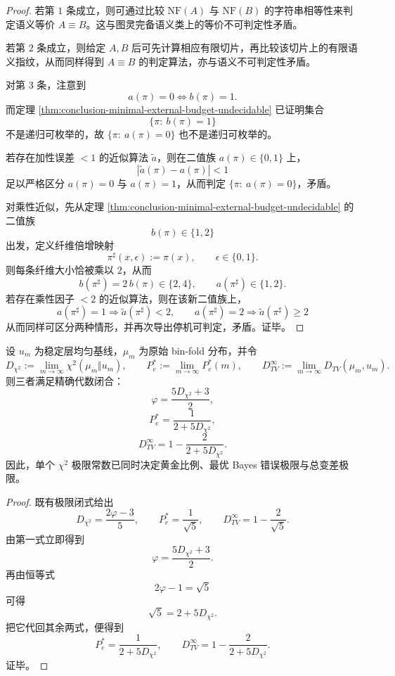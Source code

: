 \begin{proof}
若第 \(1\) 条成立，则可通过比较 \(\mathrm{NF}(A)\) 与 \(\mathrm{NF}(B)\) 的字符串相等性来判定语义等价 \(A\equiv B\)。这与图灵完备语义类上的等价不可判定性矛盾。

若第 \(2\) 条成立，则给定 \(A,B\) 后可先计算相应有限切片，再比较该切片上的有限语义指纹，从而同样得到 \(A\equiv B\) 的判定算法，亦与语义不可判定性矛盾。

对第 \(3\) 条，注意到
\[
a(\pi)=0 \iff b(\pi)=1.
\]
而定理 \ref{thm:conclusion-minimal-external-budget-undecidable} 已证明集合
\[
\{\pi:\ b(\pi)=1\}
\]
不是递归可枚举的，故 \(\{\pi:\ a(\pi)=0\}\) 也不是递归可枚举的。

若存在加性误差 \(<1\) 的近似算法 \(\widetilde a\)，则在二值族 \(a(\pi)\in\{0,1\}\) 上，
\[
|\widetilde a(\pi)-a(\pi)|<1
\]
足以严格区分 \(a(\pi)=0\) 与 \(a(\pi)=1\)，从而判定 \(\{\pi:\ a(\pi)=0\}\)，矛盾。

对乘性近似，先从定理 \ref{thm:conclusion-minimal-external-budget-undecidable} 的二值族
\[
b(\pi)\in\{1,2\}
\]
出发，定义纤维倍增映射
\[
\pi^\sharp(x,\epsilon):=\pi(x),
\qquad
\epsilon\in\{0,1\}.
\]
则每条纤维大小恰被乘以 \(2\)，从而
\[
b(\pi^\sharp)=2\,b(\pi)\in\{2,4\},
\qquad
a(\pi^\sharp)\in\{1,2\}.
\]
若存在乘性因子 \(<2\) 的近似算法，则在该新二值族上，
\[
a(\pi^\sharp)=1\Rightarrow \widetilde a(\pi^\sharp)<2,
\qquad
a(\pi^\sharp)=2\Rightarrow \widetilde a(\pi^\sharp)\ge 2
\]
从而同样可区分两种情形，并再次导出停机可判定，矛盾。证毕。
\end{proof}

\begin{theorem}\label{thm:conclusion-binfold-single-constant-holography}
设 \(u_m\) 为稳定层均匀基线，\(\mu_m\) 为原始 bin-fold 分布，并令
\[
D_{\chi^2}:=\lim_{m\to\infty}\chi^2(\mu_m\Vert u_m),
\qquad
P_e^\ast:=\lim_{m\to\infty}P_e^\ast(m),
\qquad
D_{TV}^\infty:=\lim_{m\to\infty}D_{TV}(\mu_m,u_m).
\]
则三者满足精确代数闭合：
\[
\varphi=\frac{5D_{\chi^2}+3}{2},
\]
\[
P_e^\ast=\frac{1}{2+5D_{\chi^2}},
\]
\[
D_{TV}^\infty=1-\frac{2}{2+5D_{\chi^2}}.
\]
因此，单个 \(\chi^2\) 极限常数已同时决定黄金比例、最优 Bayes 错误极限与总变差极限。
\end{theorem}

\begin{proof}
既有极限闭式给出
\[
D_{\chi^2}=\frac{2\varphi-3}{5},
\qquad
P_e^\ast=\frac1{\sqrt5},
\qquad
D_{TV}^\infty=1-\frac2{\sqrt5}.
\]
由第一式立即得到
\[
\varphi=\frac{5D_{\chi^2}+3}{2}.
\]
再由恒等式
\[
2\varphi-1=\sqrt5
\]
可得
\[
\sqrt5=2+5D_{\chi^2}.
\]
把它代回其余两式，便得到
\[
P_e^\ast=\frac{1}{2+5D_{\chi^2}},
\qquad
D_{TV}^\infty=1-\frac{2}{2+5D_{\chi^2}}.
\]
证毕。
\end{proof}

